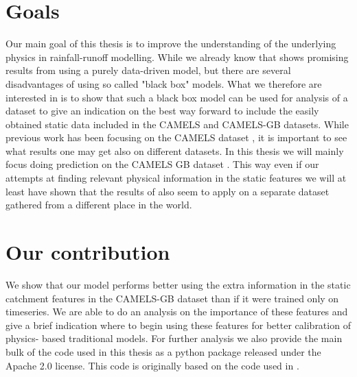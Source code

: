 \section{Goals}
Our main goal of this thesis is to improve the understanding of the underlying 
physics in rainfall-runoff modelling. While we already know that \citet{lstm_third_paper} 
shows promising results from using a purely data-driven model, but there are several 
disadvantages of using so called "black box" models. What we therefore are interested 
in is to show that such a black box model can be used for analysis of a dataset 
to give an indication on the best way forward to include the easily obtained 
static data included in the CAMELS \citep{CAMELS_US} and CAMELS-GB \citep{CAMELS_GB} 
datasets. 
While previous work has been focusing on the 
CAMELS dataset \citep{CAMELS_US}, it is important to see what results one may get 
also on different datasets. In this thesis we will mainly focus doing prediction on 
the CAMELS GB dataset \citep{CAMELS_GB}. This way even if our attempts at finding 
relevant physical information in the static features we will at least have shown 
that the results of \citet{lstm_third_paper} also seem to apply on a separate dataset 
gathered from a different place in the world. 
\section{Our contribution}
We show that our model performs better using the extra information in the static 
catchment features in the CAMELS-GB dataset than if it were trained only on timeseries.
We are able to do an analysis on the importance of these features and give a brief 
indication where to begin using these features for better calibration of physics-
based traditional models. For further analysis we also provide the main bulk of 
the code used in this thesis as a python package released under the Apache 2.0 
license. This code is originally based on the code used in \citet{lstm_second_paper}.
